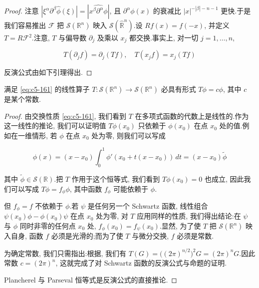 \begin{proof}
注意 $|\xi^\alpha\partial^\beta\hat{\phi}(\xi)| = |\widehat{x^\beta\partial^\alpha\phi}|$, 且 $\partial^\alpha\phi(x)$ 的衰减比 $|x|^{-|\beta|-n-1}$ 更快.于是我们容易推出 $\mathcal{F}$ 把 $\mathcal{S}(\mathbb{R}^n)$ 映入 $\mathcal{S}(\widehat{\mathbb{R}}^n)$.设 $Rf(x) = f(-x)$, 并定义 $T = R\mathcal{F}^2$.注意, $T$ 与偏导数 $\partial_j$ 及乘以 $x_j$ 都交换.事实上, 对一切 $j = 1, \ldots, n$,

\begin{equation}
T(\partial_j f) = \partial_j(Tf), \quad T(x_jf) = x_j(Tf)\label{eq:c5-161}
\end{equation}

反演公式由如下引理得出.
\end{proof}

\begin{lemma}\label{lem:c5-2.3}
满足 \eqref{eq:c5-161} 的线性算子 $T: \mathcal{S}(\mathbb{R}^n)\longrightarrow\mathcal{S}(\mathbb{R}^n)$ 必具有形式 $T\phi = c\phi$, 其中 $c$ 是某个常数.
\end{lemma}

\begin{proof}
由交换性质 \eqref{eq:c5-161}, 我们看到 $T$ 在多项式函数的代数上是线性的.作为这一线性的推论, 我们可以证明值 $T\phi(x_0)$ 只依赖于 $\phi(x_0)$ 在点 $x_0$ 处的值.例如在一维情形, 若 $\phi$ 在点 $x_0$ 处为零, 则我们可以写成

\[
\phi(x) = (x-x_0)\int_0^1\phi'(x_0+t(x-x_0))\, dt = (x-x_0)\tilde{\phi}
\]

其中 $\tilde{\phi}\in\mathcal{S}(\mathbb{R})$.把 $T$ 作用于这个恒等式, 我们看到 $T\phi(x_0) = 0$ 也成立, 因此我们可以写成 $T\phi = f_\phi\phi$, 其中函数 $f_\phi$ 可能依赖于 $\phi$.

但 $f_\phi = f$ 不依赖于 $\phi$.若 $\psi$ 是任何另一个 Schwartz 函数, 线性组合 $\psi(x_0)\phi - \phi(x_0)\psi$ 在点 $x_0$ 处为零, 对 $T$ 应用同样的性质, 我们得出结论:在 $\psi$ 与 $\phi$ 同时非零的任何点 $x_0$ 处, $f_\phi(x_0) = f_\psi(x_0)$.显然, 为了使 $T$ 把 $\mathcal{S}(\mathbb{R}^n)$ 映入自身, 函数 $f$ 必须是光滑的;而为了使 $T$ 与微分交换, $f$ 必须是常数.

为确定常数, 我们只需指出:根据, 我们有 $T(G) = \bigl((2\pi)^{n/2}\bigr)^2G = (2\pi)^nG$.因此常数 $c = (2\pi)^n$, 这就完成了对 Schwartz 函数的反演公式与命题的证明.

Plancherel 与 Parseval 恒等式是反演公式的直接推论.
\end{proof}

